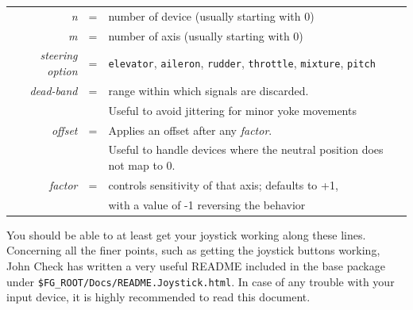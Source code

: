 \begin{tabular}{rcl}
 \textit{n} &=& number of device (usually starting with 0)\\
 \textit{m} &=& number of axis (usually starting with 0)\\
 \textit{steering option} &=& \texttt{elevator}, \texttt{aileron}, \texttt{rudder},
 \texttt{throttle}, \texttt{mixture}, \texttt{pitch}\\
 \textit{dead-band} &=& range within which signals are discarded.\\
                   && Useful to avoid jittering for minor yoke movements\\
 \textit{offset} &=& Applies an offset after any \textit{factor}. \\
                   && Useful to handle devices where the neutral position does not map to 0.\\
  \textit{factor} &=& controls sensitivity of that axis; defaults to +1,\\
                 &&with a value of -1 reversing the behavior
  \end{tabular}
 \medskip

You should be able to at least get your joystick working along
these lines. Concerning all the finer points, such as getting the joystick buttons
working, John Check has written a very useful README  included in the base package under \texttt{\$FG\_ROOT/Docs/README.Joystick.html}. In case of any trouble with your input device, it is highly recommended to read this document.

